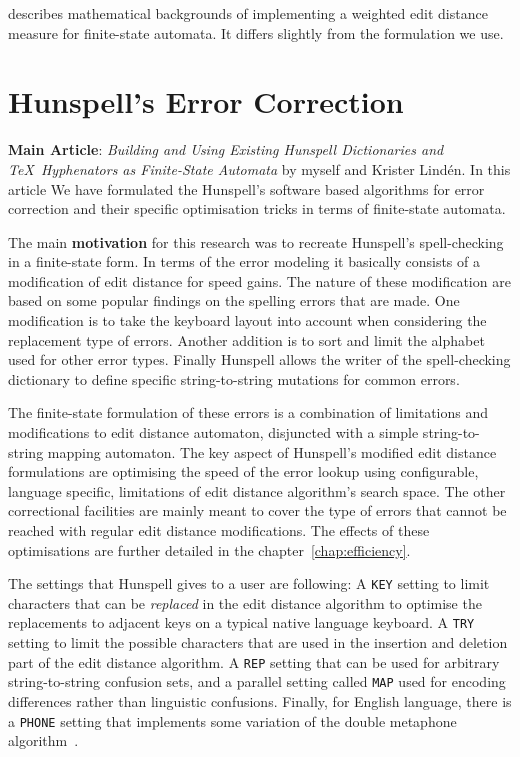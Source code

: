 \documentclass[officiallayout,draft]{unihelcompling}
\begin{document}
\citet{mohri2003edit} describes mathematical backgrounds of
implementing a weighted edit distance measure for finite-state automata. It
differs slightly from the formulation we use.

\section{Hunspell's Error Correction}
\label{sec:Hunspell-error}

\textbf{Main Article}: \emph{Building and Using Existing Hunspell Dictionaries
and \TeX\ Hyphenators as Finite-State Automata} by myself and Krister Lindén.
In this article We have formulated the Hunspell's software based algorithms for
error correction and their specific optimisation tricks in terms of
finite-state automata.

The main \textbf{motivation} for this research was to recreate Hunspell's
spell-checking in a finite-state form. In terms of the  error modeling it
basically consists of a modification of edit distance for speed gains. The
nature of these modification are based on some popular findings on the spelling
errors that are made. One modification is to take the keyboard layout into
account when considering the replacement type of errors. Another addition is to
sort and limit the alphabet used for other error types. Finally Hunspell allows
the writer of the spell-checking dictionary to define specific string-to-string
mutations for common errors.

The finite-state formulation of these errors is a combination of limitations
and modifications to edit distance automaton, disjuncted with a simple
string-to-string mapping automaton. The key aspect of Hunspell's modified
edit distance formulations are optimising the speed of the error lookup using
configurable, language specific, limitations of edit distance algorithm's
search space. The other correctional facilities are mainly meant to cover the
type of errors that cannot be reached with regular edit distance modifications.
The effects of these optimisations are further detailed in the 
chapter~\ref{chap:efficiency}.

The settings that Hunspell gives to a user are following: A \texttt{KEY}
setting to limit characters that can be \emph{replaced} in the edit distance
algorithm to optimise the replacements to adjacent keys on a typical native
language keyboard. A \texttt{TRY} setting to limit the possible characters
that are used in the insertion and deletion part of the edit distance
algorithm. A \texttt{REP} setting that can be used for arbitrary
string-to-string confusion sets, and a parallel setting called \texttt{MAP}
used for encoding differences rather than linguistic confusions.  Finally, for
English language, there is a \texttt{PHONE} setting that implements some
variation of the double metaphone algorithm~\citep{philips2000double}.
\end{document}
